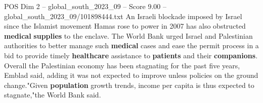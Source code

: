 \begin{textsample}{POS Dim 2 – global\_south\_2023\_09 – Score 9.00 – global\_south\_2023\_09/101898444.txt}
An Israeli blockade imposed by Israel since the Islamist movement Hamas rose to power in 2007 has also obstructed \textbf{medical} \textbf{supplies} to the enclave.
The World Bank urged Israel and Palestinian authorities to better manage such \textbf{medical} cases and ease the permit process in a bid to provide timely \textbf{healthcare} assistance to \textbf{patients} and their \textbf{companions}.
Overall the Palestinian economy has been stagnating for the past five years, Emblad said, adding it was not expected to improve unless policies on the ground change."Given \textbf{population} growth trends, income per capita is thus expected to stagnate,"the World Bank said.

\end{textsample}
